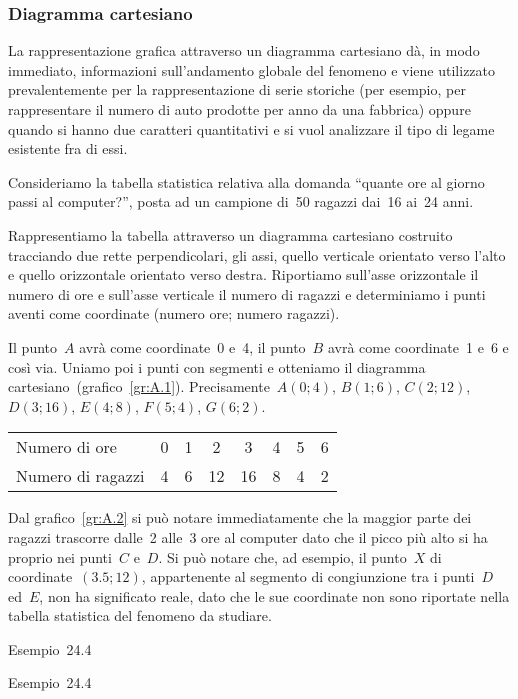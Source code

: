 \subsubsection{Diagramma cartesiano}
La rappresentazione grafica attraverso un diagramma cartesiano dà, in modo immediato, informazioni sull'andamento globale del fenomeno e viene
utilizzato prevalentemente per la rappresentazione di serie storiche (per esempio, per rappresentare il numero di auto prodotte per anno da una fabbrica)
oppure quando si hanno due caratteri quantitativi e si vuol analizzare il tipo di legame esistente fra di essi.


\begin{exrig}
 \begin{esempio}

Consideriamo la tabella statistica relativa alla domanda ``quante ore al giorno passi al computer?'', posta ad un
campione di~50 ragazzi dai~16 ai~24 anni.

Rappresentiamo la tabella attraverso un diagramma cartesiano costruito tracciando due rette perpendicolari, gli assi, quello verticale orientato verso
l'alto e quello orizzontale orientato verso destra. Riportiamo sull'asse orizzontale il numero di ore e sull'asse verticale il numero di ragazzi e determiniamo
i punti aventi come coordinate (numero ore; numero ragazzi).

Il punto~$A$ avrà come coordinate~0 e~4, il punto~$B$ avrà come coordinate~1 e~6 e così via. Uniamo poi
i punti con segmenti e otteniamo il diagramma cartesiano~(grafico~\ref{gr:A.1}).
Precisamente~$A(0;4)$, $B(1;6)$, $C(2;12)$, $D(3;16)$, $E(4;8)$, $F(5;4)$, $G(6;2)$.

\begin{center}
\begin{tabular}{lccccccc}
\toprule
Numero di ore & 0 & 1 &2 & 3 & 4 & 5 & 6\\
Numero di ragazzi & 4 & 6 & 12 & 16 & 8 & 4 & 2 \\
\bottomrule
\end{tabular}
\end{center}
Dal grafico~\ref{gr:A.2} si può notare immediatamente che la maggior parte dei ragazzi trascorre dalle~2 alle~3 ore al computer dato che il picco più
alto si ha proprio nei punti~$C$ e~$D$.
Si può notare che, ad esempio, il punto~$X$ di coordinate~$(3.5;12)$, appartenente al segmento di congiunzione tra i punti~$D$ ed~$E$,
non ha significato reale, dato che le sue coordinate non sono riportate nella tabella statistica del fenomeno da studiare.
\begin{grafico}[t]
\begin{minipage}{0.5\textwidth}

\caption{Esempio~24.4}\label{gr:A.1}
\end{minipage}\hfill
\begin{minipage}{0.5\textwidth}

\caption{Esempio~24.4}\label{gr:A.2}
\end{minipage}
\end{grafico}
\end{esempio}
\end{exrig}


